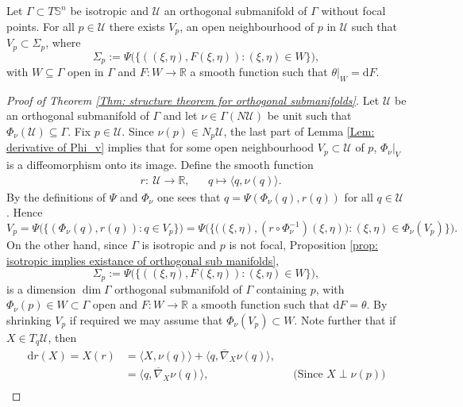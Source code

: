 \documentclass[10pt,a4paper]{amsart}
\def\S{\mathbb{S}}
\newcommand{\td}{\mathrm{d}}
\begin{document}
\begin{Thm}\label{Thm: structure theorem for orthogonal submanifolds}
    Let $\Gamma\subset T\S^n$ be isotropic and $\mathcal{U}$ an orthogonal submanifold of $\Gamma$ without focal points. For all $p\in \mathcal{U}$ there exists $V_p$, an open neighbourhood of $p$ in $\mathcal{U}$ such that $V_p\subset \Sigma_p$, where
    \[
    \Sigma_p:=\Psi\Big(\Big\{((\xi,\eta),F(\xi,\eta)): (\xi,\eta)\in W\Big\}\Big),
    \]
    with $W\subseteq\Gamma$ open in $\Gamma$ and $F:W\to \mathbb{R}$ a smooth function such that $\theta|_W=\td F$.
\end{Thm}

\begin{proof}[Proof of Theorem \ref{Thm: structure theorem for orthogonal submanifolds}]
    Let $\mathcal{U}$ be an orthogonal submanifold of $\Gamma$ and let $\nu\in\Gamma(N\mathcal{U})$ be unit such that $\Phi_\nu(\mathcal{U})\subseteq \Gamma$. Fix $p\in \mathcal{U}$. Since $\nu(p)\in N_p\mathcal{U}$, the last part of Lemma \ref{Lem: derivative of Phi_v} implies that for some open neighbourhood $V_p\subset \mathcal{U}$ of $p$,  $\Phi_\nu|_{V}$ is a diffeomorphism onto its image.  Define the smooth function
    \begin{align*}
        &r:~\mathcal{U}\to\mathbb{R}, &&q \mapsto \langle q, \nu(q)\rangle.
    \end{align*}
   By the definitions of $\Psi$ and $\Phi_\nu$ one sees that
    $q=\Psi(\Phi_\nu(q),r(q))$ for all $q\in \mathcal{U}$. Hence
    \[
    V_p=\Psi\Big(\Big\{(\Phi_\nu(q),r(q)): q\in V_p\Big\}\Big)=\Psi\Big(\Big\{\big((\xi,\eta),(r\circ\Phi_\nu^{-1})(\xi,\eta)\big): (\xi,\eta)\in \Phi_\nu(V_p)\Big\}\Big).
    \]
    On the other hand, since $\Gamma$ is isotropic and $p$ is not focal, Proposition \ref{prop: isotropic implies existance of orthogonal sub manifolds},
    \[
    \Sigma_p:=\Psi\Big(\Big\{((\xi,\eta),F(\xi,\eta)): (\xi,\eta)\in W\Big\}\Big),
    \]
    is a dimension $\dim \Gamma$ orthogonal submanifold of $\Gamma$ containing $p$, with $\Phi_\nu(p)\in W\subset \Gamma$ open and $F:W\to\mathbb{R}$ a smooth function such that $\td F=\theta$. By shrinking $V_p$ if required we may assume that $\Phi_\nu(V_p)\subset W$. Note further that if $X\in T_q\mathcal{U}$, then
    \begin{align*}
        \td r(X)=X(r)&=\langle X, \nu(q) \rangle + \langle q, \overline\nabla_X \nu(q)\rangle,\\
        &=\langle q, \overline\nabla_X \nu(q)\rangle, &&\text{(Since $X\perp \nu(p)$)}\\

\end{align*}
\end{proof}
\end{document}
